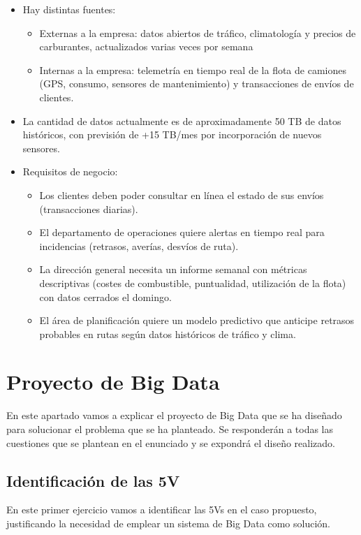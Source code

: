 \begin{itemize}
	\item Hay distintas fuentes:
	\begin{itemize}
		\item Externas a la empresa: datos abiertos de tráfico, climatología y precios de carburantes, actualizados varias veces por semana
		\item Internas a la empresa: telemetría en tiempo real de la flota de camiones (GPS, consumo, sensores de mantenimiento) y transacciones de envíos de clientes.
	\end{itemize}
	
	\item La cantidad de datos actualmente es de aproximadamente 50 TB de datos históricos, con previsión de +15 TB/mes por incorporación de nuevos sensores.
	\item Requisitos de negocio:
	\begin{itemize}
		\item Los clientes deben poder consultar en línea el estado de sus envíos (transacciones diarias).
		\item El departamento de operaciones quiere alertas en tiempo real para incidencias (retrasos, averías, desvíos de ruta).
		\item La dirección general necesita un informe semanal con métricas descriptivas (costes de combustible, puntualidad, utilización de la flota) con datos cerrados el domingo.
		\item El área de planificación quiere un modelo predictivo que anticipe retrasos probables en rutas según datos históricos de tráfico y clima.
	\end{itemize}
\end{itemize}

\section{Proyecto de Big Data}
En este apartado vamos a explicar el proyecto de Big Data que se ha diseñado para solucionar el problema que se ha planteado. Se responderán a todas las cuestiones que se plantean en el enunciado y se expondrá el diseño realizado.


\subsection{Identificación de las 5V} 
En este primer ejercicio vamos a identificar las 5Vs en el caso propuesto, justificando la necesidad de emplear un sistema de Big Data como solución.

